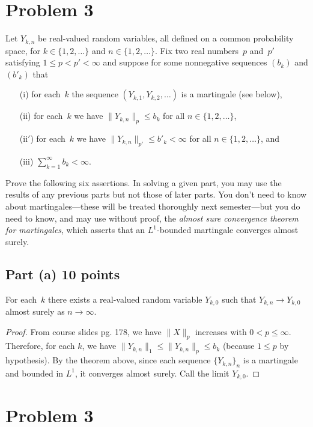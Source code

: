 \documentclass[letterpaper, 12pt]{article}
\begin{document}
\pagebreak

\section*{Problem 3}
Let $Y_{k, n}$ be real-valued random variables, all defined on a common probability space, for 
$k \in \{1, 2, \dots\}$ and $n \in \{1, 2, \dots\}$.  Fix two real numbers~$p$ and~$p'$ satisfying $1 \leq p < p' < \infty$ and suppose for some nonnegative sequences $(b_k)$ and $(b'_k)$ that
\begin{enumerate}
\item[(i)] for each~$k$ the sequence $(Y_{k, 1}, Y_{k, 2}, \dots)$ is a martingale (see below),
\item[(ii)] for each~$k$ we have $\| Y_{k, n} \|_p \leq b_k$ for all $n \in \{1, 2, \dots\}$,
\item[(ii$'$)] for each~$k$ we have $\| Y_{k, n} \|_{p'} \leq b'_k < \infty$ for all $n \in \{1, 2, \dots\}$, and
\item[(iii)] $\sum_{k = 1}^{\infty} b_k < \infty$.
\end{enumerate}
Prove the following six assertions.  In solving a given part, you may use the results of any previous parts but not those of later parts.  You don't need to know about martingales---these will be treated thoroughly next semester---but you do need to know, and may use without proof, the \emph{almost sure convergence theorem for martingales}, which asserts that an $L^1$-bounded martingale converges almost surely.

\subsection*{Part (a) 10 points}

For each~$k$ there exists a real-valued random variable $Y_{k, 0}$ such that $Y_{k, n} \to Y_{k, 0}$ almost surely as $n \to \infty$.

\begin{proof}
From course slides pg. 178, we have $\|X \|_p$ increases with $0 < p \leq \infty$. Therefore, for each $k$, we have $\|Y_{k,n} \|_1 \leq \|Y_{k,n} \|_p \leq b_k$ (because $1 \leq p $ by hypothesis). By the theorem above, since each sequence $\{Y_{k,n} \}_n$ is a martingale and bounded in $L^1$, it converges almost surely. Call the limit $Y_{k,0}$.
\end{proof}

\pagebreak


\section*{Problem 3}
\end{document}
